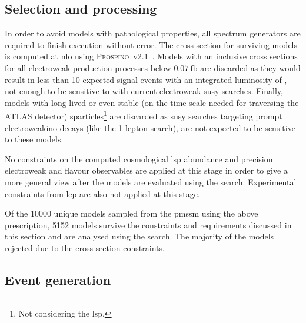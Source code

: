 \subsection{Selection and processing}

In order to avoid models with pathological properties, all spectrum generators are required to finish execution without error. The cross section for surviving models is computed at \gls{nlo} using \textsc{Prospino}~v2.1~\cite{prospino:314229, prospino_2:1999xh}. Models with an inclusive cross sections for all electroweak production processes below $\SI{0.07}{\femto\barn}$ are discarded as they would result in less than 10 expected signal events with an integrated luminosity of \onethirtynineifb, not enough to be sensitive to with current electroweak \gls{susy} searches. 
Finally, models with long-lived or even stable (on the time scale needed for traversing the ATLAS detector) sparticles\footnote{Not considering the \gls{lsp}.} are discarded as \gls{susy} searches targeting prompt electroweakino decays (like the 1-lepton search), are not expected to be sensitive to these models. 

No constraints on the computed cosmological \gls{lsp} abundance and precision electroweak and flavour observables are applied at this stage in order to give a more general view after the models are evaluated using the \onelepton search. Experimental constraints from \eg \gls{lep} are also not applied at this stage. 

Of the \num[group-separator={,}]{10000} unique models sampled from the \gls{pmssm} using the above prescription, \num[group-separator={,}]{5152} models survive the constraints and requirements discussed in this section and are analysed using the \onelepton search. The majority of the models rejected due to the cross section constraints.

\subsection{Event generation}

